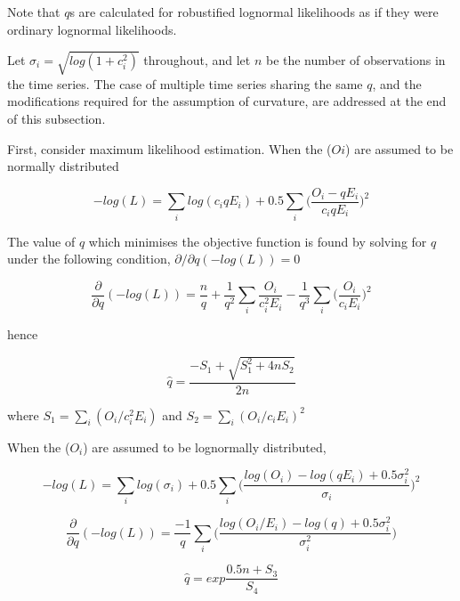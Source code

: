 
Note that $q$s are calculated for robustified lognormal likelihoods as if they were ordinary lognormal likelihoods.

Let $\sigma_i = \sqrt{log(1 + c_i^2)}$ throughout, and let $n$ be the number of observations in the time series. The case of multiple time series sharing the same $q$, and the modifications required for the assumption of curvature, are addressed at the end of this subsection.

First, consider maximum likelihood estimation. When the ($Oi$) are assumed to be normally distributed

\begin{equation}\label{EQ:1}
-log(L) = \sum_i log (c_iqE_i) + 0.5\sum_i \bigg(\frac{O_i - qE_i}{c_iqE_i} \bigg)^2
\end{equation}

The value of $q$ which minimises the objective function is found by solving for $q$ under the following condition, $\partial/\partial q(-log(L)) = 0$

\begin{equation}\label{EQ:2}
\frac{\partial }{\partial q}(-log(L)) = \frac{n}{q} + \frac{1}{q^2} \sum_i \frac{O_i}{c_i^2E_i} - \frac{1}{q^3} \sum_i \bigg(\frac{O_i}{c_iE_i}\bigg)^2
\end{equation}

hence

\begin{equation}\label{EQ:3}
\hat q = \frac{-S_1 + \sqrt{S_1^2 + 4nS_2}}{2n}
\end{equation}

where $S_1 = \sum_i (O_i/c_i^2E_i)$ and $S_2 = \sum_i (O_i/c_iE_i)^2$

When the ($O_i$) are assumed to be lognormally distributed,

\begin{equation}\label{EQ:4}
-log(L) = \sum_i log (\sigma_i) + 0.5\sum_i \bigg(\frac{log(O_i) - log(qE_i) + 0.5\sigma_i^2}{\sigma_i} \bigg)^2
\end{equation}

\begin{equation}\label{EQ:5}
\frac{\partial }{\partial q}(-log(L)) = \frac{-1}{q} \sum_i\bigg( \frac{log(O_i/E_i) - log(q) + 0.5\sigma_i^2}{\sigma_i^2}\bigg)
\end{equation}

\begin{equation}\label{EQ:6}
\hat q = exp\frac{0.5n + S_3}{S_4}
\end{equation}

